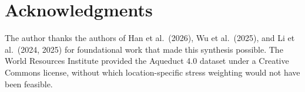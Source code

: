 \documentclass[conference,10pt]{IEEEtran}
\begin{document}
\section*{Acknowledgments}

The author thanks the authors of Han et al.~(2026), Wu et al.~(2025),
and Li et al.~(2024, 2025) for foundational work that made this
synthesis possible. The World Resources Institute provided the
Aqueduct 4.0 dataset under a Creative Commons license, without which
location-specific stress weighting would not have been feasible.




\end{document}
